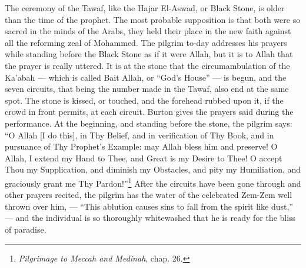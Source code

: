 \documentclass[a4paper, 11pt, oneside, polutonikogreek, english]{article}
\begin{document}
The ceremony of the Tawaf, like the Hajar El-Aswad, or Black Stone, is older than the time of the prophet. The most probable supposition is that both were so sacred in the minds of the Arabs, they held their place in the new faith against all the reforming zeal of Mohammed. The pilgrim to-day addresses his prayers while standing before the Black Stone as if it were Allah, but it is to Allah that the prayer is really uttered. It is at the stone that the circumambulation of the Ka'abah --- which is called Bait Allah, or ``God's House'' --- is begun, and the seven circuits, that being the number made in the Tawaf, also end at the same spot. The stone is kissed, or touched, and the forehead rubbed upon it, if the crowd in front permits, at each circuit. Burton gives the prayers said during the performance. At the beginning, and standing before the stone, the pilgrim says: ``O Allah [I do this], in Thy Belief, and in verification of Thy Book, and in pursuance of Thy Prophet's Example: may Allah bless him and preserve! O Allah, I extend my Hand to Thee, and Great is my Desire to Thee! O accept Thou my Supplication, and diminish my Obstacles, and pity my Humiliation, and graciously grant me Thy Pardon!''\footnote{\emph{Pilgrimage to Meccah and Medinah}, chap. 26.} After the circuits have been gone through and other prayers recited, the pilgrim has the water of the celebrated Zem-Zem well thrown over him, --- ``This ablution causes sins to fall from the spirit like dust,'' --- and the individual is so thoroughly whitewashed that he is ready for the bliss of paradise.
\end{document}
